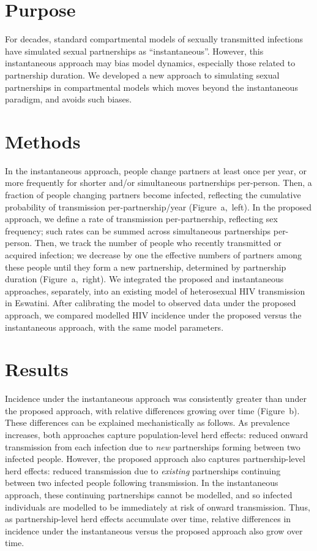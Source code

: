 \section{Purpose}
For decades, standard compartmental models of sexually transmitted infections
have simulated sexual partnerships as ``instantaneous''.
However, this instantaneous approach may bias model dynamics,
especially those related to partnership duration.
We developed a new approach to simulating sexual partnerships in compartmental models
which moves beyond the instantaneous paradigm, and avoids such biases.
\section{Methods}
In the instantaneous approach, people change partners at least once per year,
or more frequently for shorter and/or simultaneous partnerships per-person.
Then, a fraction of people changing partners become infected,
reflecting the cumulative probability of transmission per-partnership/year (Figure~a,~left).
In the proposed approach, we define a rate of transmission per-partnership, reflecting sex frequency;
such rates can be summed across simultaneous partnerships per-person.
Then, we track the number of people who recently transmitted or acquired infection;
we decrease by one the effective numbers of partners among these people
until they form a new partnership, determined by partnership duration (Figure~a,~right).
We integrated the proposed and instantaneous approaches, separately,
into an existing model of heterosexual HIV transmission in Eswatini.
After calibrating the model to observed data under the proposed approach,
we compared modelled HIV incidence under the proposed versus the instantaneous approach,
with the same model parameters.
\section{Results}
Incidence under the instantaneous approach was
consistently greater than under the proposed approach,
with relative differences growing over time (Figure~b).
These differences can be explained mechanistically as follows.
As prevalence increases, both approaches capture population-level herd effects:
reduced onward transmission from each infection due to
\emph{new} partnerships forming between two infected people.
However, the proposed approach also captures partnership-level herd effects:
reduced transmission due to \emph{existing} partnerships
continuing between two infected people following transmission.
In the instantaneous approach, these continuing partnerships cannot be modelled,
and so infected individuals are modelled to be immediately at risk of onward transmission.
Thus, as partnership-level herd effects accumulate over time,
relative differences in incidence under the instantaneous versus the proposed approach
also grow over time.
